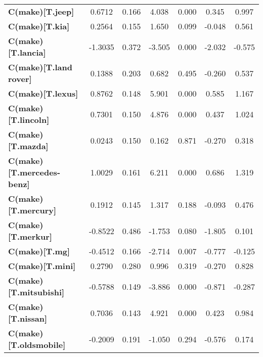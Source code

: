 \begin{center}
\begin{tabular}{lcccccc}
\textbf{C(make)[T.jeep]}          &       0.6712  &        0.166     &     4.038  &         0.000        &        0.345    &        0.997     \\
\textbf{C(make)[T.kia]}           &       0.2564  &        0.155     &     1.650  &         0.099        &       -0.048    &        0.561     \\
\textbf{C(make)[T.lancia]}        &      -1.3035  &        0.372     &    -3.505  &         0.000        &       -2.032    &       -0.575     \\
\textbf{C(make)[T.land rover]}    &       0.1388  &        0.203     &     0.682  &         0.495        &       -0.260    &        0.537     \\
\textbf{C(make)[T.lexus]}         &       0.8762  &        0.148     &     5.901  &         0.000        &        0.585    &        1.167     \\
\textbf{C(make)[T.lincoln]}       &       0.7301  &        0.150     &     4.876  &         0.000        &        0.437    &        1.024     \\
\textbf{C(make)[T.mazda]}         &       0.0243  &        0.150     &     0.162  &         0.871        &       -0.270    &        0.318     \\
\textbf{C(make)[T.mercedes-benz]} &       1.0029  &        0.161     &     6.211  &         0.000        &        0.686    &        1.319     \\
\textbf{C(make)[T.mercury]}       &       0.1912  &        0.145     &     1.317  &         0.188        &       -0.093    &        0.476     \\
\textbf{C(make)[T.merkur]}        &      -0.8522  &        0.486     &    -1.753  &         0.080        &       -1.805    &        0.101     \\
\textbf{C(make)[T.mg]}            &      -0.4512  &        0.166     &    -2.714  &         0.007        &       -0.777    &       -0.125     \\
\textbf{C(make)[T.mini]}          &       0.2790  &        0.280     &     0.996  &         0.319        &       -0.270    &        0.828     \\
\textbf{C(make)[T.mitsubishi]}    &      -0.5788  &        0.149     &    -3.886  &         0.000        &       -0.871    &       -0.287     \\
\textbf{C(make)[T.nissan]}        &       0.7036  &        0.143     &     4.921  &         0.000        &        0.423    &        0.984     \\
\textbf{C(make)[T.oldsmobile]}    &      -0.2009  &        0.191     &    -1.050  &         0.294        &       -0.576    &        0.174     \\

\end{tabular}
\end{center}
